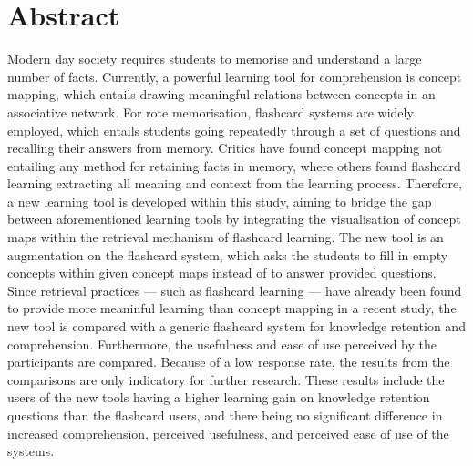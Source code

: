 \chapter{Abstract}

Modern day society requires students to memorise and understand a large number of facts. Currently, a powerful learning tool for comprehension is concept mapping, which entails drawing meaningful relations between concepts in an associative network. For rote memorisation, flashcard systems are widely employed, which entails students going repeatedly through a set of questions and recalling their answers from memory. Critics have found concept mapping not entailing any method for retaining facts in memory, where others found flashcard learning extracting all meaning and context from the learning process. Therefore, a new learning tool is developed within this study, aiming to bridge the gap between aforementioned learning tools by integrating the visualisation of concept maps within the retrieval mechanism of flashcard learning. The new tool is an augmentation on the flashcard system, which asks the students to fill in empty concepts within given concept maps instead of to answer provided questions. Since retrieval practices --- such as flashcard learning --- have already been found to provide more meaninful learning than concept mapping in a recent study, the new tool is compared with a generic flashcard system for knowledge retention and comprehension. Furthermore, the usefulness and ease of use perceived by the participants are compared. Because of a low response rate, the results from the comparisons are only indicatory for further research. These results include the users of the new tools having a higher learning gain on knowledge retention questions than the flashcard users, and there being no significant difference in increased comprehension, perceived usefulness, and perceived ease of use of the systems.

